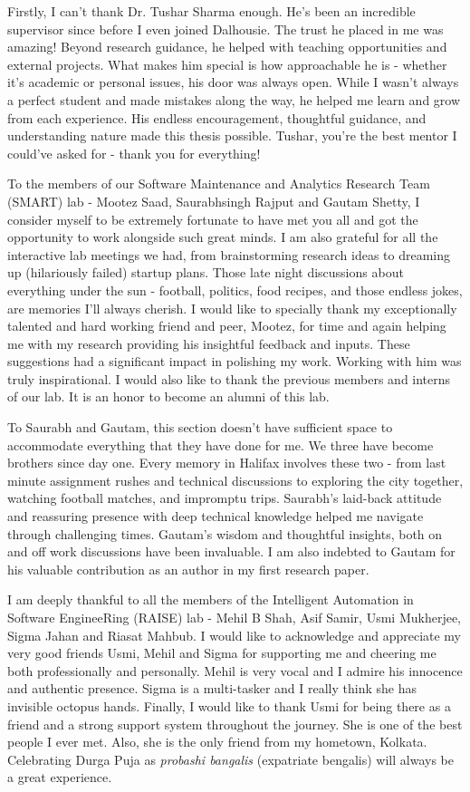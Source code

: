 \noindent

Firstly, I can't thank Dr. Tushar Sharma enough. He's been an incredible supervisor since before I even joined Dalhousie. The trust he placed in me was amazing! Beyond research guidance, he helped with teaching opportunities and external projects. What makes him special is how approachable he is - whether it's academic or personal issues, his door was always open. While I wasn't always a perfect student and made mistakes along the way, he helped me learn and grow from each experience. His endless encouragement, thoughtful guidance, and understanding nature made this thesis possible. Tushar, you're the best mentor I could've asked for - thank you for everything!

To the members of our Software Maintenance and Analytics Research Team (SMART) lab - Mootez Saad, Saurabhsingh Rajput and Gautam Shetty, I consider myself to be extremely fortunate to have met you all and got the opportunity to work alongside such great minds. I am also grateful for all the interactive lab meetings we had, from brainstorming research ideas to dreaming up (hilariously failed) startup plans. Those late night discussions about everything under the sun - football, politics, food recipes, and those endless jokes, are memories I'll always cherish. I would like to specially thank my exceptionally talented and hard working friend and peer, Mootez, for time and again helping me with my research providing his insightful feedback and inputs. These suggestions had a significant impact in polishing my work. Working with him was truly inspirational. I would also like to thank the previous members and interns of our lab. It is an honor to become an alumni of this lab.

To Saurabh and Gautam, this section doesn't have sufficient space to accommodate everything that they have done for me. We three have become brothers since day one. Every memory in Halifax involves these two - from last minute assignment rushes and technical discussions to exploring the city together, watching football matches, and impromptu trips. Saurabh's laid-back attitude and reassuring presence with deep technical knowledge helped me navigate through challenging times. Gautam's wisdom and thoughtful insights, both on and off work discussions have been invaluable. I am also indebted to Gautam for his valuable contribution as an author in my first research paper.

I am deeply thankful to all the members of the Intelligent Automation in Software EngineeRing (RAISE) lab - Mehil B Shah, Asif Samir, Usmi Mukherjee, Sigma Jahan and Riasat Mahbub. I would like to acknowledge and appreciate my very good friends Usmi, Mehil and Sigma for supporting me and cheering me both professionally and personally. Mehil is very vocal and I admire his innocence and authentic presence. Sigma is a multi-tasker and I really think she has invisible octopus hands. Finally, I would like to thank Usmi for being there as a friend and a strong support system throughout the journey. She is one of the best people I ever met. Also, she is the only friend from my hometown, Kolkata. Celebrating Durga Puja as \textit{probashi bangalis} (expatriate bengalis) will always be a great experience.


